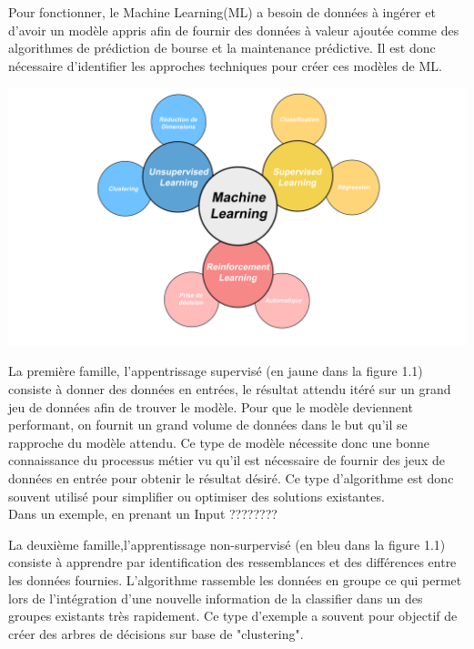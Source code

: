 \documentclass[12pt,a4paper]{report}
\begin{document}
Pour fonctionner, le Machine Learning(ML) a besoin de données à ingérer et d'avoir un modèle appris afin de fournir des données à valeur ajoutée comme des algorithmes de prédiction de bourse et la maintenance prédictive. Il est donc nécessaire d'identifier les approches techniques pour créer ces modèles de ML.\\

\begin{center}
	\includegraphics[scale=0.2]{ML_vignette}
	\label{fig1}
\end{center}

La première famille, l'appentrissage supervisé (en jaune dans la figure 1.1) consiste à donner des données en entrées, le résultat attendu itéré sur un grand jeu de données afin de trouver le modèle. Pour que le modèle deviennent performant, on fournit un grand volume de données dans le but qu'il se rapproche du modèle attendu. Ce type de modèle nécessite donc une bonne connaissance du processus métier vu qu'il est nécessaire de fournir des jeux de données en entrée pour obtenir le résultat désiré. Ce type d'algorithme est donc souvent utilisé pour simplifier ou optimiser des solutions existantes.\\

Dans un exemple, en prenant un Input ????????

La deuxième famille,l'apprentissage non-surpervisé (en bleu dans la figure 1.1) consiste à apprendre par identification des ressemblances et des différences entre les données fournies. L'algorithme rassemble les données en groupe ce qui permet lors de l'intégration d'une nouvelle information de la classifier dans un des groupes existants très rapidement. Ce type d'exemple a souvent pour objectif de créer des arbres de décisions sur base de "clustering".\\
\end{document}

